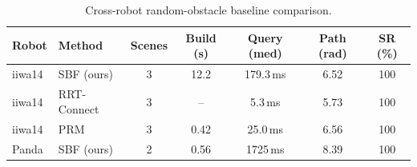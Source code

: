 \begin{table}[t]
\centering
\caption{Cross-robot random-obstacle baseline comparison.}
\label{tab:randscenes}
\begin{tabular}{llccccc}
\toprule
Robot & Method & Scenes & Build (s) & Query (med) & Path (rad) & SR (\%) \\
\midrule
iiwa14 & SBF (ours) & 3 & 12.2 & 179.3\,ms & 6.52 & 100 \\
iiwa14 & RRT-Connect & 3 & -- & 5.3\,ms & 5.73 & 100 \\
iiwa14 & PRM & 3 & 0.42 & 25.0\,ms & 6.56 & 100 \\
Panda & SBF (ours) & 2 & 0.56 & 1725\,ms & 8.39 & 100 \\
\bottomrule
\end{tabular}
\end{table}

